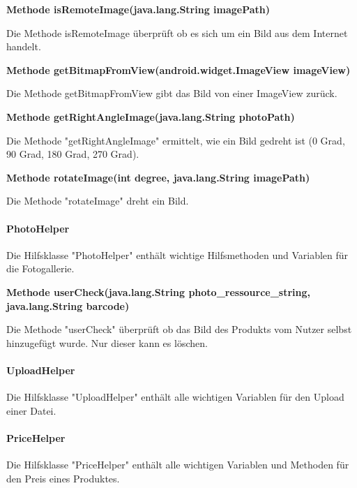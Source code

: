 \documentclass{scrartcl}
\begin{document}
\noindent\textbf{Methode isRemoteImage(java.lang.String imagePath)}

\noindent Die Methode isRemoteImage überprüft ob es sich um ein Bild aus dem Internet handelt. \newline 

\noindent\textbf{Methode getBitmapFromView(android.widget.ImageView imageView)}

\noindent Die Methode getBitmapFromView gibt das Bild von einer ImageView zurück. \newline 

\noindent\textbf{Methode getRightAngleImage(java.lang.String photoPath)}

\noindent Die Methode "getRightAngleImage" ermittelt, wie ein Bild gedreht ist (0 Grad, 90 Grad, 180 Grad, 270 Grad). \newline 

\noindent\textbf{Methode rotateImage(int degree,                                     java.lang.String imagePath)}

\noindent Die Methode "rotateImage" dreht ein Bild. \newline

\paragraph{PhotoHelper}
Die Hilfsklasse "PhotoHelper" enthält wichtige Hilfsmethoden und Variablen für die Fotogallerie. \newline 

\noindent\textbf{Methode userCheck(java.lang.String photo\_ressource\_string, \newline       java.lang.String barcode)}

\noindent Die Methode "userCheck" überprüft ob das Bild des Produkts vom Nutzer selbst hinzugefügt wurde. Nur dieser kann es löschen. \newline 

\paragraph{UploadHelper}
Die Hilfsklasse "UploadHelper" enthält alle wichtigen Variablen für den Upload einer Datei. \newline 

\paragraph{PriceHelper}
Die Hilfsklasse "PriceHelper" enthält alle wichtigen Variablen und Methoden für den Preis eines Produktes. \newline
\end{document}
